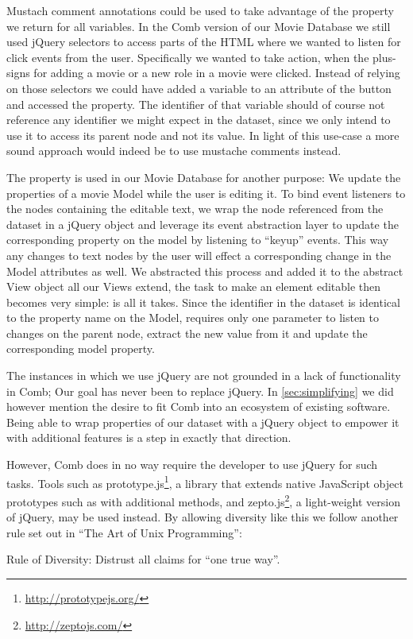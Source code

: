 \documentclass[thesis.tex]{subfiles}
\begin{document}
Mustach comment annotations could be used to take advantage of the
 property we return for all variables. In the Comb version
of our Movie Database we still used jQuery selectors to access parts of the HTML
where we wanted to listen for click events from the user. Specifically we wanted
to take action, when the plus-signs for adding a movie or a new role in a movie
were clicked.
Instead of relying on those selectors we could have added a variable to an
attribute of the button and accessed the  property.
The identifier of that variable should of course not reference any identifier we
might expect in the dataset, since we only intend to use it to access its parent
node and not its value.
In light of this use-case a more sound approach would indeed be to use mustache
comments instead.

The  property is used in our Movie Database for another
purpose: We update the properties of a movie Model while the user is editing it.
To bind event listeners to the nodes containing the editable text, we wrap the
node referenced from the dataset in a jQuery object and leverage its event
abstraction layer to update the corresponding property on the model by listening
to ``keyup'' events. This way any changes to text nodes by the user will effect
a corresponding change in the Model attributes as well.
We abstracted this process and added it to the abstract View object
all our Views extend, the task to make an element editable then becomes very
simple:  is all it takes. Since the identifier in the
dataset is identical to the property name on the Model, 
requires only one parameter to listen to changes on the parent node, extract the
new value from it and update the corresponding model property.

The instances in which we use jQuery are not grounded in a lack of functionality
in Comb; Our goal has never been to replace jQuery.
In \ref{sec:simplifying} we did however mention the desire to fit Comb into an
ecosystem of existing software. Being able to wrap properties of our dataset
with a jQuery object to empower it with additional features is a step in exactly
that direction.

However, Comb does in no way require the developer to use jQuery for such tasks.
Tools such as prototype.js\footnote{\url{http://prototypejs.org/}}, a library
that extends native JavaScript object prototypes such as  with
additional methods, and zepto.js\footnote{\url{http://zeptojs.com/}}, a
light-weight version of jQuery, may be used instead.
By allowing diversity like this we follow another rule set out in
``The Art of Unix Programming'':
\begin{citequote}{\cite[Chapter 1]{UXART}}
Rule of Diversity: Distrust all claims for ``one true way''.
\end{citequote}
\end{document}

